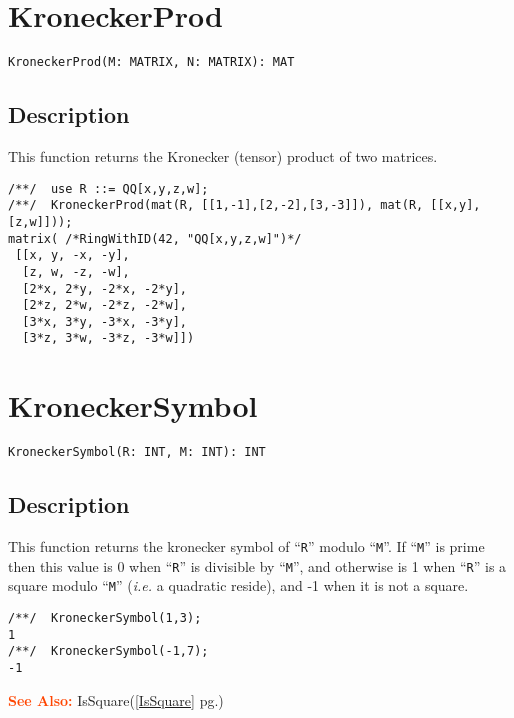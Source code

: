 \documentclass[a4paper]{mybook}
\newenvironment{command}{}{} %
\newcommand\SeeAlso{\par\textcolor{OrangeRed}{\textbf{\large See Also: }}}
\begin{document}
\section{KroneckerProd}
\label{KroneckerProd}
\begin{command} %


\begin{Verbatim}[label=syntax, rulecolor=\color{MidnightBlue},
frame=single]
KroneckerProd(M: MATRIX, N: MATRIX): MAT
\end{Verbatim}


\subsection*{Description}

This function returns the Kronecker (tensor) product of two matrices.
\begin{Verbatim}[label=example, rulecolor=\color{PineGreen}, frame=single]
/**/  use R ::= QQ[x,y,z,w];
/**/  KroneckerProd(mat(R, [[1,-1],[2,-2],[3,-3]]), mat(R, [[x,y],[z,w]]));
matrix( /*RingWithID(42, "QQ[x,y,z,w]")*/
 [[x, y, -x, -y],
  [z, w, -z, -w],
  [2*x, 2*y, -2*x, -2*y],
  [2*z, 2*w, -2*z, -2*w],
  [3*x, 3*y, -3*x, -3*y],
  [3*z, 3*w, -3*z, -3*w]])
\end{Verbatim}


\end{command} %

\section{KroneckerSymbol}
\label{KroneckerSymbol}
\begin{command} %


\begin{Verbatim}[label=syntax, rulecolor=\color{MidnightBlue},
frame=single]
KroneckerSymbol(R: INT, M: INT): INT
\end{Verbatim}


\subsection*{Description}

This function returns the kronecker symbol of ``\verb&R&'' modulo ``\verb&M&''.
If ``\verb&M&'' is prime then this value is 0 when ``\verb&R&'' is divisible
by ``\verb&M&'', and otherwise is 1 when ``\verb&R&'' is a square modulo
``\verb&M&'' (\textit{i.e.} a quadratic reside), and -1 when it is not a square.
\begin{Verbatim}[label=example, rulecolor=\color{PineGreen}, frame=single]
/**/  KroneckerSymbol(1,3);
1
/**/  KroneckerSymbol(-1,7);
-1
\end{Verbatim}


\SeeAlso %
  IsSquare(\ref{IsSquare} pg.\pageref{IsSquare})
\end{command} %
\end{document}

